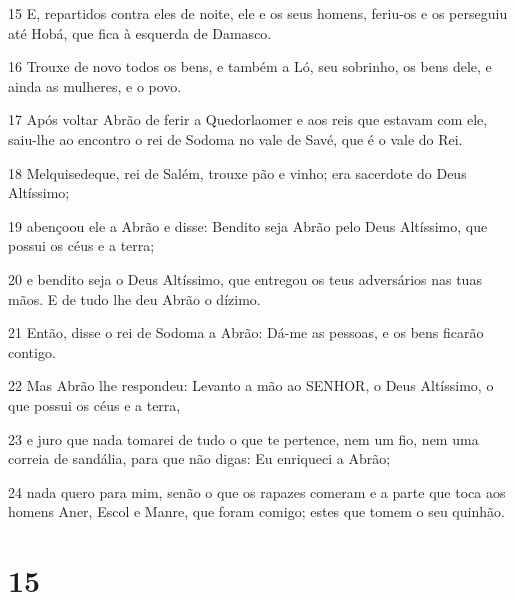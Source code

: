 \par 15 E, repartidos contra eles de noite, ele e os seus homens, feriu-os e os perseguiu até Hobá, que fica à esquerda de Damasco.
\par 16 Trouxe de novo todos os bens, e também a Ló, seu sobrinho, os bens dele, e ainda as mulheres, e o povo.
\par 17 Após voltar Abrão de ferir a Quedorlaomer e aos reis que estavam com ele, saiu-lhe ao encontro o rei de Sodoma no vale de Savé, que é o vale do Rei.
\par 18 Melquisedeque, rei de Salém, trouxe pão e vinho; era sacerdote do Deus Altíssimo;
\par 19 abençoou ele a Abrão e disse: Bendito seja Abrão pelo Deus Altíssimo, que possui os céus e a terra;
\par 20 e bendito seja o Deus Altíssimo, que entregou os teus adversários nas tuas mãos. E de tudo lhe deu Abrão o dízimo.
\par 21 Então, disse o rei de Sodoma a Abrão: Dá-me as pessoas, e os bens ficarão contigo.
\par 22 Mas Abrão lhe respondeu: Levanto a mão ao SENHOR, o Deus Altíssimo, o que possui os céus e a terra,
\par 23 e juro que nada tomarei de tudo o que te pertence, nem um fio, nem uma correia de sandália, para que não digas: Eu enriqueci a Abrão;
\par 24 nada quero para mim, senão o que os rapazes comeram e a parte que toca aos homens Aner, Escol e Manre, que foram comigo; estes que tomem o seu quinhão.

\chapter{15}

